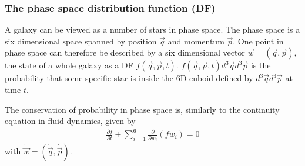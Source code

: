 \documentclass[letterpaper,10pt,english]{sphinxmanual}
\begin{document}
				
				\subsubsection{The phase space distribution function (DF)}
					\label{\detokenize{NBodySimulation/Initialization:the-phase-space-distribution-function-df}}
					\sphinxAtStartPar
					A galaxy can be viewed as a number of stars in phase space.
					The phase space is a six dimensional space spanned by position \(\vec{q}\) and momentum \(\vec{p}\).
					One point in phase space can therefore be described by a six dimensional vector \(\vec{w}=(\vec{q},\vec{p})\),
					the state of a whole galaxy as a DF \(f(\vec{q},\vec{p},t)\).
					\(f(\vec{q},\vec{p},t)d^3\vec{q}d^3\vec{p}\) is the probability that some specific star is inside the 6D cuboid defined by \(d^3\vec{q}d^3\vec{p}\) at time \(t\).
					
					\sphinxAtStartPar
					The conservation of probability in phase space is, similarly to the continuity equation in fluid dynamics, given by
					\begin{equation*}
					\begin{split}\frac{\partial f }{\partial t} + \sum_{i=1}^{6} \frac{\partial}{\partial w_i}(f\dot{w}_i) = 0\end{split}
					\end{equation*}
					\sphinxAtStartPar
					with \(\dot{\vec{w}} = (\dot{\vec{q}},\dot{\vec{p}})\).
					
\end{document}
